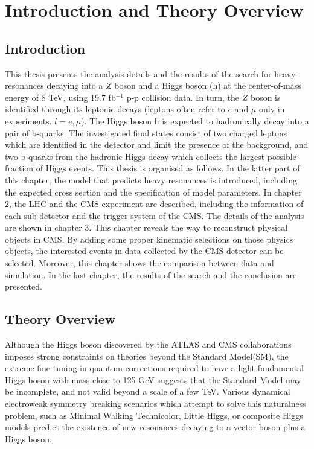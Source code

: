 \chapter{Introduction and Theory Overview}

\section{Introduction}
This thesis presents the analysis details and the results of the search for heavy resonances decaying into a $Z$ boson and a Higgs boson (h) at the center-of-mass energy of 8 TeV, using 19.7 fb$^{-1}$ p-p collision data. In turn, the $Z$ boson is identified through its leptonic decays (leptons often refer to $e$ and $\mu$ only in experiments. $l = e, \mu$). The Higgs boson h is expected to hadronically decay into a pair of b-quarks. The investigated final states consist of two charged leptons which are identified in the detector and limit the presence of the background, and two b-quarks from the hadronic Higgs decay which collects the largest possible fraction of Higgs events.
\newline This thesis is organised as follows. In the latter part of this chapter, the model that predicts heavy resonances is introduced, including the expected cross section and the specification of model parameters. In chapter 2, the LHC and the CMS experiment are described, including the information of each sub-detector and the trigger system of the CMS. The details of the analysis are shown in chapter 3. This chapter reveals the way to reconstruct physical objects in CMS. By adding some proper kinematic selections on those physics objects, the interested events in data collected by the CMS detector can be selected. Moreover, this chapter shows the comparison between data and simulation. In the last chapter, the results of the search and the conclusion are presented.

\section{Theory Overview}
Although the Higgs boson discovered by the ATLAS and CMS collaborations\cite{atlas-higgs-1,cms-higgs-1,cms-higgs-2} imposes strong constraints on theories beyond the Standard Model(SM), the extreme fine tuning in quantum corrections required to have a light fundamental Higgs boson with mass close to 125 GeV\cite{cms-higgs-3,atlas-higgs-2,atlas-higgs-3,atlas-cms-higgs} suggests that the Standard Model may be incomplete, and not valid beyond a scale of a few TeV. Various dynamical electroweak symmetry breaking scenarios which attempt to solve this naturalness problem, such as Minimal Walking Technicolor\cite{technicolor}, Little Higgs\cite{little-higgs-1,little-higgs-2,little-higgs-3}, or composite Higgs models\cite{compositehiggs-1,compositehiggs-2,compositehiggs-3} predict the existence of new resonances decaying to a vector boson plus a Higgs boson.

